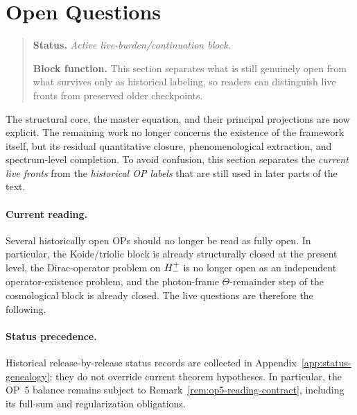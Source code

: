 \section*{Open Questions}
\begin{quote}\small
\noindent\textbf{Status.} \emph{Active live-burden/continuation block.}\par
\noindent\textbf{Block function.} This section separates what is still genuinely open from what survives only as historical labeling, so readers can distinguish live fronts from preserved older checkpoints.
\end{quote}

The structural core, the master equation, and their principal projections are
now explicit. The remaining work no longer concerns the existence of the
framework itself, but its residual quantitative closure, phenomenological
extraction, and spectrum-level completion. To avoid confusion, this section
separates the \emph{current live fronts} from the \emph{historical OP labels}
that are still used in later parts of the text.

\paragraph{Current reading.}
Several historically open OPs should no longer be read as fully open. In
particular, the Koide/triolic block is already structurally closed at the
present level, the Dirac-operator problem on $H^+_-$ is no longer open as
an independent operator-existence problem, and the photon-frame
$\Theta$-remainder step of the cosmological block is already closed. The live
questions are therefore the following.

\paragraph{Status precedence.}
Historical release-by-release status records are collected in
Appendix~\ref{app:status-genealogy}; they do not override current theorem
hypotheses. In particular, the OP~5 balance remains subject to
Remark~\ref{rem:op5-reading-contract}, including its full-sum and
regularization obligations.

